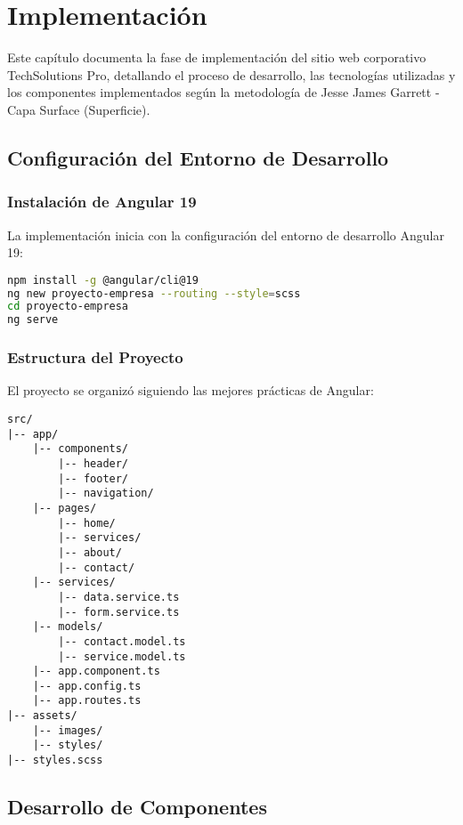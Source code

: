 \chapter{Implementación}

Este capítulo documenta la fase de implementación del sitio web corporativo TechSolutions Pro, detallando el proceso de desarrollo, las tecnologías utilizadas y los componentes implementados según la metodología de Jesse James Garrett - Capa Surface (Superficie).

\section{Configuración del Entorno de Desarrollo}

\subsection{Instalación de Angular 19}

La implementación inicia con la configuración del entorno de desarrollo Angular 19:

\begin{lstlisting}[language=bash, caption=Instalación de Angular CLI]
npm install -g @angular/cli@19
ng new proyecto-empresa --routing --style=scss
cd proyecto-empresa
ng serve
\end{lstlisting}

\subsection{Estructura del Proyecto}

El proyecto se organizó siguiendo las mejores prácticas de Angular:

\begin{verbatim}
src/
|-- app/
    |-- components/
        |-- header/
        |-- footer/
        |-- navigation/
    |-- pages/
        |-- home/
        |-- services/
        |-- about/
        |-- contact/
    |-- services/
        |-- data.service.ts
        |-- form.service.ts
    |-- models/
        |-- contact.model.ts
        |-- service.model.ts
    |-- app.component.ts
    |-- app.config.ts
    |-- app.routes.ts
|-- assets/
    |-- images/
    |-- styles/
|-- styles.scss
\end{verbatim}

\section{Desarrollo de Componentes}

